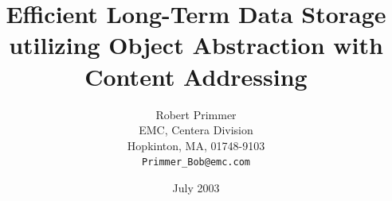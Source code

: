 \title{Efficient Long-Term Data Storage utilizing Object Abstraction with Content Addressing}
\author{Robert Primmer\\{\small EMC, Centera Division}\\{\small Hopkinton, MA, 01748-9103}\\{\small\texttt{Primmer\_Bob@emc.com}}}
\date{July 2003}
